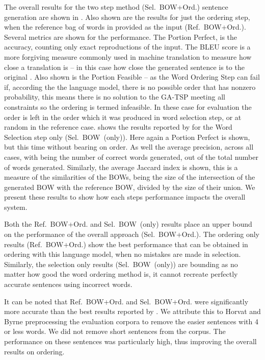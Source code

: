 \documentclass[11pt]{article}
\theoremstyle{plain}
\theoremstyle{definition}
\newcommand{\textcite}{\protect\newcite}
\newcommand{\oracletitle}{Ref.~BOW+Ord.}
\newcommand{\selectiontitle}{Sel.~BOW~(only)}
\newcommand{\twosteptitle}{Sel.~BOW+Ord.}
\begin{document}


The overall results for the two step method (\twosteptitle{}) sentence generation are shown in . Also shown are the results for just the ordering step, when the reference bag of words in provided as the input (\oracletitle{}). Several metrics are shown for the performance. The Portion Perfect, is the accuracy, counting only exact reproductions of the input. The BLEU score is a more forgiving measure commonly used in machine translation to measure how close a translation is -- in this case how close the generated sentence is to the original \cite{Papineni2002}. Also shown is the Portion Feasible -- as the Word Ordering Step can fail if, according the the language model, there is no possible order that has nonzero probability, this means there is no solution to the GA-TSP meeting all constraints so the ordering is termed infeasible. In these case for evaluation the order is left in the order which it was produced in word selection step, or at random in the reference case.
 shows the results reported by \cite{White2015BOWgen} for the Word Selection step only (\selectiontitle{}). Here again a Portion Perfect is shown, but this time without bearing on order. As well the average precision, across all cases, with being the number of correct words generated, out of the total number of words generated. Similarly, the average Jaccard index is shown, this is a measure of the similarities of the BOWs, being the size of the intersection of the generated BOW with the reference BOW, divided by the size of their union. We present these results to show how each steps performance impacts the overall system.

Both the \oracletitle{} and \selectiontitle{} results place an upper bound on the performance of the overall approach (\twosteptitle{}). The ordering only results (\oracletitle{}) show the best performance that can be obtained in ordering with this language model, when no mistakes are made in selection. Similarly, the selection only results (\selectiontitle{}) are bounding as no matter how good the word ordering method is, it cannot recreate perfectly accurate sentences using incorrect words.


It can be noted that \oracletitle{} and \twosteptitle{} were significantly more accurate than the best results reported by \textcite{Horvat2014}. We attribute this to Horvat and Byrne preprocessing the evaluation corpora to remove the easier sentences with 4 or less words. We did not remove short sentences from the corpus. The performance on these sentences was particularly high, thus improving the overall results on ordering.
\end{document}
